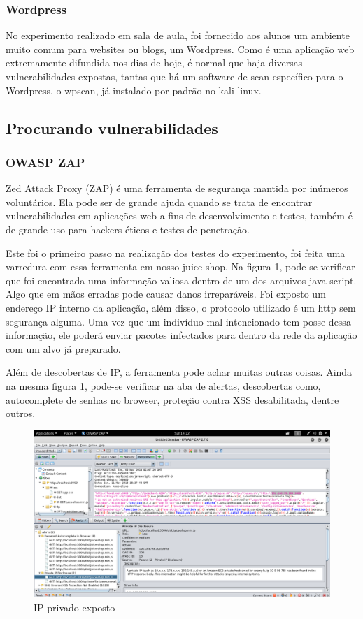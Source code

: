 \documentclass[journal]{IEEEtran}
\begin{document}
\subsubsection{Wordpress}
No experimento realizado em sala de aula, foi fornecido aos alunos um ambiente muito comum para websites ou blogs, um Wordpress. Como é uma aplicação web extremamente difundida nos dias de hoje, é normal que haja diversas vulnerabilidades expostas, tantas que há um software de scan específico para o Wordpress, o wpscan, já instalado por padrão no kali linux. 

\subsection{Procurando vulnerabilidades}
\subsubsection{OWASP ZAP}
Zed Attack Proxy (ZAP) é uma ferramenta de segurança mantida por inúmeros voluntários. Ela pode ser de grande ajuda quando se trata de encontrar vulnerabilidades em aplicações web a fins de desenvolvimento e testes, também é de grande uso para hackers éticos e testes de penetração. \par
Este foi o primeiro passo na realização dos testes do experimento, foi feita uma varredura com essa ferramenta em nosso juice-shop. Na figura 1, pode-se verificar que foi encontrada uma informação valiosa dentro de um dos arquivos java-script. Algo que em mãos erradas pode causar danos irreparáveis. Foi exposto um endereço IP interno da aplicação, além disso, o protocolo utilizado é um http sem segurança alguma. Uma vez que um indivíduo mal intencionado tem posse dessa informação, ele poderá enviar pacotes infectados para dentro da rede da aplicação com um alvo já preparado.
\par
Além de descobertas de IP, a ferramenta pode achar muitas outras coisas. Ainda na mesma figura 1, pode-se verificar na aba de alertas, descobertas como, autocomplete de senhas no browser, proteção contra XSS desabilitada, dentre outros.

\begin{figure}[h!]
	\includegraphics[width=\linewidth]{../fotos/juice_shop/private_IP_found.png}
	\caption{IP privado exposto}
	\label{fig:private_ip}
\end{figure}
\end{document}
